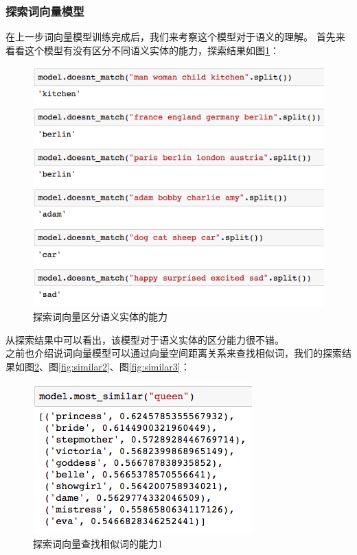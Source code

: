 \subsubsection{探索词向量模型}
在上一步词向量模型训练完成后，我们来考察这个模型对于语义的理解。
首先来看看这个模型有没有区分不同语义实体的能力，探索结果如图\ref{fig:doesntsimilar}：
\begin{figure}[h]
\centering
\includegraphics[width=0.9\linewidth]{doesnt_similar}
\caption[doesnt_similar]{探索词向量区分语义实体的能力}
\label{fig:doesntsimilar}
\end{figure}
从探索结果中可以看出，该模型对于语义实体的区分能力很不错。\\
之前也介绍说词向量模型可以通过向量空间距离关系来查找相似词，我们的探索结果如图\ref{fig:similar1}、图\ref{fig:similar2}、图\ref{fig:similar3}：
\begin{figure}[h]
\centering
\includegraphics[width=0.8\linewidth]{similar1}
\caption[similar1]{探索词向量查找相似词的能力1}
\label{fig:similar1}
\end{figure}
